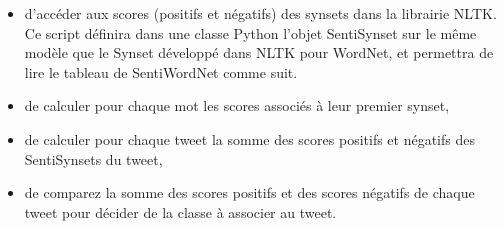 \documentclass[11pt]{article}
\providecommand{\tightlist}{%
      \setlength{\itemsep}{0pt}\setlength{\parskip}{0pt}}
\begin{document}
    \begin{itemize}
\tightlist
\item
  d'accéder aux scores (positifs et négatifs) des synsets dans la
  librairie NLTK. Ce script définira dans une classe Python l'objet
  SentiSynset sur le même modèle que le Synset développé dans NLTK pour
  WordNet, et permettra de lire le tableau de SentiWordNet comme suit.
\item
  de calculer pour chaque mot les scores associés à leur premier synset,
\item
  de calculer pour chaque tweet la somme des scores positifs et négatifs
  des SentiSynsets du tweet,
\item
  de comparez la somme des scores positifs et des scores négatifs de
  chaque tweet pour décider de la classe à associer au tweet.
\end{itemize}
\end{document}
